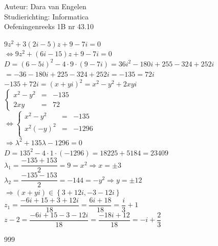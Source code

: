\documentclass[a4paper]{article}
\begin{document}
  
\noindent \large Auteur: Dara van Engelen \\
\noindent \large Studierichting: Informatica\\
\noindent \large Oefeningenreeks 1B nr 43.10\\

\medskip

\normalsize

$ 9z^2 + 3(2i-5)z + 9 - 7i = 0$\\

$ \Leftrightarrow 9z^2 + (6i -15)z + 9 - 7i = 0$\\

$ D = (6-5i)^2 - 4 \cdot 9 \cdot (9-7i) = 36i^2 -180i + 255 - 324 + 252i$\\

$ = -36 - 180i + 225 - 324 + 252i = -135 = 72i $\\

$-135 + 72i = (x+yi)^2 = x^2 - y^2 + 2xyi$ \\

$\left\{
	\begin{array}{lll} 
		x^2 - y^2 &=& -135 \\
		2xy &=& 72
	\end{array}
\right .$\\

$\Leftrightarrow\left\{
	\begin{array}{lll} 
		x^2 - y^2 &=& -135\\
		x^2(-y)^2 &=& -1296\\
	\end{array}
\right .$\\

$\Rightarrow\lambda^2 + 135\lambda -1296 = 0$\\

$ D = 135^2-4\cdot 1 \cdot (-1296) = 18225 + 5184 = 23409$\\

$\lambda_1 = \dfrac{-135+153}{2}  = 9 = x^2 \Rightarrow x = \pm3$\\

$\lambda_2 = \dfrac{-135-153}{2} = -144 = -y^2 \Rightarrow y = \pm12$\\

$\Rightarrow (x+yi) \in \left \{ 3+12i , -3-12i\right\}$\\

$z_1 = \dfrac{-6i + 15 + 3 + 12i}{18} = \dfrac{6i + 18}{18} = \dfrac{i}{3} + 1$\\

$z-2 = \dfrac{-6i + 15 -3 - 12i }{18} = \dfrac{-18i+12}{18} = -i + \dfrac{2}{3}$\\


\begin{thebibliography}{999}
\end{thebibliography}
\end{document}
